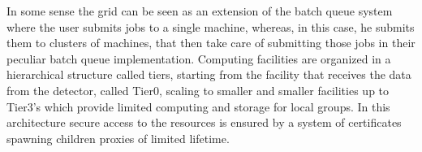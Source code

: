 In some sense the grid can be seen as an extension of the batch queue system where the user submits jobs to a single machine, whereas, in this case, he submits them to clusters of machines, that then take care of submitting those jobs in their peculiar batch queue implementation. Computing facilities are organized in a hierarchical structure called tiers, starting from the facility that receives the data from the detector, called Tier0, scaling to smaller and smaller facilities up to Tier3's which provide limited computing and storage for local groups. In this architecture secure access to the resources is ensured by a system of certificates spawning children proxies of limited lifetime.

